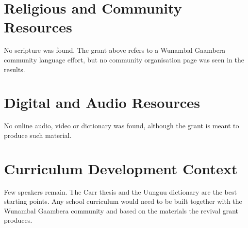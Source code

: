 \documentclass[12pt]{article}
\begin{document}
\section{Religious and Community Resources}
No scripture was found. The grant above refers to a Wunambal Gaambera community language effort, but no community organisation page was seen in the results.

\section{Digital and Audio Resources}
No online audio, video or dictionary was found, although the grant is meant to produce such material.

\section{Curriculum Development Context}
Few speakers remain. The Carr thesis and the Uunguu dictionary are the best starting points. Any school curriculum would need to be built together with the Wunambal Gaambera community and based on the materials the revival grant produces.
\end{document}
